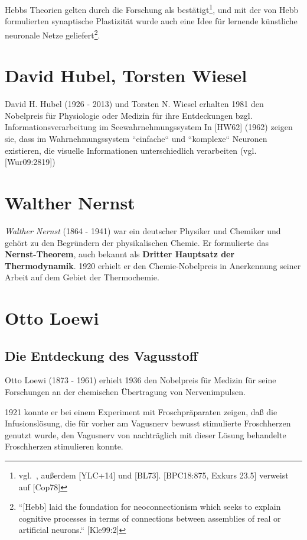 Hebbs Theorien gelten durch die Forschung als bestätigt\footnote{
vgl.~\cite[833]{Flo19}, außerdem [YLC+14] und [BL73]. [BPC18:875, Exkurs 23.5] verweist auf [Cop78]
}, und mit der von Hebb formulierten synaptische Plastizität wurde auch eine Idee für lernende künstliche neuronale Netze geliefert\footnote{
``[Hebb] laid the foundation for neoconnectionism which seeks to explain cognitive processes in terms of connections between assemblies of real or artificial neurons.`` [Kle99:2]
}.


\section{David Hubel, Torsten Wiesel}\label{appendix:hubelwiesel}

David H. Hubel (1926 - 2013) und Torsten N. Wiesel erhalten 1981 den Nobelpreis für Physiologie oder Medizin  für ihre Entdeckungen bzgl. Informationsverarbeitung im Seewahrnehmungssystem
In [HW62] (1962) zeigen sie, dass im Wahrnehmungssystem ``einfache`` und ``komplexe`` Neuronen existieren, die visuelle Informationen unterschiedlich verarbeiten (vgl. [Wur09:2819])

\section{Walther Nernst}
\textit{Walther Nernst} (1864 - 1941) war ein deutscher Physiker und Chemiker und gehört zu den Begründern der physikalischen Chemie. Er formulierte das \textbf{Nernst-Theorem}, auch bekannt als \textbf{Dritter Hauptsatz der Thermodynamik}. 1920 erhielt er den Chemie-Nobelpreis in Anerkennung seiner Arbeit auf dem Gebiet der Thermochemie.


\section{Otto Loewi}
\subsection*{Die Entdeckung des Vagusstoff}

Otto Loewi (1873 - 1961) erhielt 1936 den Nobelpreis für Medizin für seine Forschungen an der chemischen Übertragung von Nervenimpulsen.

1921 konnte er bei einem Experiment mit Froschpräparaten zeigen, daß die Infusionslösung, die für vorher am Vagusnerv bewusst stimulierte Froschherzen genutzt wurde, den Vagusnerv von nachträglich mit dieser Lösung behandelte Froschherzen stimulieren konnte.

